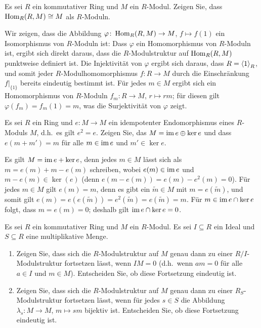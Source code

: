 \begin{question}
  Es sei $R$ ein kommutativer Ring und $M$ ein $R$-Modul.
  Zeigen Sie, dass $\operatorname{Hom}_R(R, M) \cong M$ als $R$-Moduln.
\end{question}


\begin{solution}
  Wir zeigen, dass die Abbildung $\varphi \colon \operatorname{Hom}_R(R, M) \to M$, $f \mapsto f(1)$ ein Isomorphismus von $R$-Moduln ist:
  Dass $\varphi$ ein Homomorphismus von $R$-Moduln ist, ergibt sich direkt daraus, dass die $R$-Modulstruktur auf $\operatorname{Hom}_R(R, M)$ punktweise definiert ist.
  Die Injektivität von $\varphi$ ergibt sich daraus, dass $R = \left\langle 1 \right\rangle_R$, und somit jeder $R$-Modulhomomorphismus $f \colon R \to M$ durch die Einschränkung $f|_{\{1\}}$ bereits eindeutig bestimmt ist.
  Für jedes $m \in M$ ergibt sich ein Homomorphismus von $R$-Moduln $f_m \colon R \to M$, $r \mapsto rm$;
  für diesen gilt $\varphi(f_m) = f_m(1) = m$, was die Surjektivität von $\varphi$ zeigt.
\end{solution}


\begin{question}
  Es sei $R$ ein Ring und $e \colon M \to M$ ein idempotenter Endomorphismus eines $R$-Moduls $M$, d.h.\ es gilt $e^2 = e$.
  Zeigen Sie, das $M = \operatorname{im} e \oplus \ker e$ und dass $e(m + m') = m$ für alle $m \in \operatorname{im} e$ und $m' \in \ker e$.
\end{question}


\begin{solution}
  Es gilt $M = \operatorname{im} e + \ker e$, denn jedes $m \in M$ lässt sich als $m = e(m) + m - e(m)$ schreiben, wobei $e(m) \in \operatorname{im} e$ und $m - e(m) \in \ker(e)$ (denn $e(m - e(m)) = e(m) - e^2(m) = 0$).
  Für jedes $m \in M$ gilt $e(m) = m$, denn es gibt ein $\tilde{m} \in M$ mit $m = e(\tilde{m})$, und somit gilt $e(m) = e(e(\tilde{m})) = e^2(\tilde{m}) = e(\tilde{m}) = m$.
  Für $m \in \operatorname{im} e \cap \ker e$ folgt, dass $m = e(m) = 0$;
  deshalb gilt $\operatorname{im} e \cap \ker e = 0$.
\end{solution}


\begin{question}
  Es sei $R$ ein kommutativer Ring und $M$ ein $R$-Modul.
  Es sei $I \subseteq R$ ein Ideal und $S \subseteq R$ eine multiplikative Menge.
  \begin{enumerate}
    \item
      Zeigen Sie, dass sich die $R$-Modulstruktur auf $M$ genau dann zu einer $R/I$-Modulstruktur fortsetzen lässt, wenn $IM =  0$ (d.h.\ wenn $am = 0$ für alle $a \in I$ und $m \in M$).
      Entscheiden Sie, ob diese Fortsetzung eindeutig ist.
    \item
      Zeigen Sie, dass sich die $R$-Modulstruktur auf $M$ genau dann zu einer $R_S$-Modulstruktur fortsetzen lässt, wenn für jedes $s \in S$ die Abbildung $\lambda_s \colon M \to M$, $m \mapsto sm$ bijektiv ist.
      Entscheiden Sie, ob diese Fortsetzung eindeutig ist.
  \end{enumerate}
\end{question}

